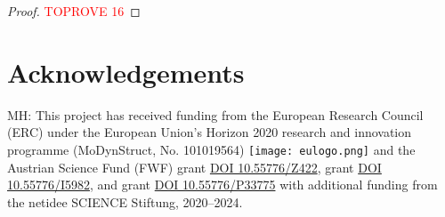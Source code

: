 \documentclass[11pt,a4paper]{article}
\begin{document}
\directedcutcounting*
\begin{proof}\textcolor{red}{TOPROVE 16}\end{proof}
\section*{Acknowledgements}
\label{sec:ack}

MH: This project has received funding from the European Research Council (ERC) under the European Union's Horizon 2020 research and innovation programme (MoDynStruct, No. 101019564)  \texttt{[image: eulogo.png]} and the Austrian Science Fund (FWF) grant  \href{https://www.doi.org/10.55776/Z422}{DOI 10.55776/Z422}, grant  \href{https://www.doi.org/10.55776/I5982}{DOI 10.55776/I5982}, and grant  \href{https://www.doi.org/10.55776/P33775}{DOI 10.55776/P33775} with additional funding from the netidee SCIENCE Stiftung, 2020–2024.
 

\def\bibfont{\small}

\end{document}
